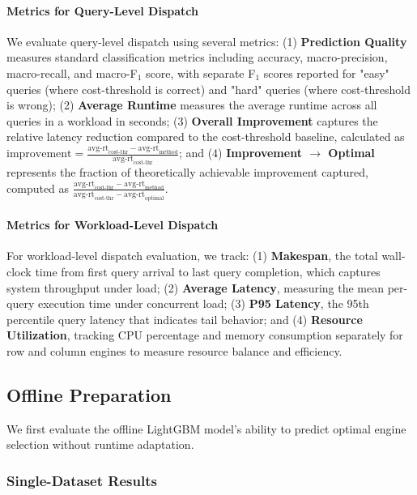 \documentclass[sigconf, nonacm]{acmart}
\begin{document}
\paragraph{Metrics for Query-Level Dispatch}
We evaluate query-level dispatch using several metrics: (1) \textbf{Prediction Quality} measures standard classification metrics including accuracy, macro-precision, macro-recall, and macro-F$_1$ score, with separate F$_1$ scores reported for "easy" queries (where cost-threshold is correct) and "hard" queries (where cost-threshold is wrong); (2) \textbf{Average Runtime} measures the average runtime across all queries in a workload in seconds; (3) \textbf{Overall Improvement} captures the relative latency reduction compared to the cost-threshold baseline, calculated as $\text{improvement} = \frac{\text{avg-rt}_{\text{cost-thr}} - \text{avg-rt}_{\text{method}}}{\text{avg-rt}_{\text{cost-thr}}}$; and (4) \textbf{Improvement $\to$ Optimal} represents the fraction of theoretically achievable improvement captured, computed as $\frac{\text{avg-rt}_{\text{cost-thr}} - \text{avg-rt}_{\text{method}}}{\text{avg-rt}_{\text{cost-thr}} - \text{avg-rt}_{\text{optimal}}}$.

\paragraph{Metrics for Workload-Level Dispatch}
For workload-level dispatch evaluation, we track: (1) \textbf{Makespan}, the total wall-clock time from first query arrival to last query completion, which captures system throughput under load; (2) \textbf{Average Latency}, measuring the mean per-query execution time under concurrent load; (3) \textbf{P95 Latency}, the 95th percentile query latency that indicates tail behavior; and (4) \textbf{Resource Utilization}, tracking CPU percentage and memory consumption separately for row and column engines to measure resource balance and efficiency.


\subsection{Offline Preparation}
We first evaluate the offline LightGBM model's ability to predict optimal engine selection without runtime adaptation.

\subsubsection{Single-Dataset Results}
\label{sssec:single-ds}
\end{document}
